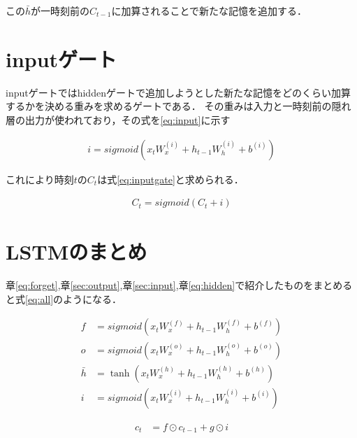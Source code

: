 \documentclass[a4j,11pt,report]{jsbook}
\begin{document}
この$\bar{h}$が一時刻前の$C_{t-1}$に加算されることで新たな記憶を追加する．


\section{inputゲート\label{sec:input}}

inputゲートではhiddenゲートで追加しようとした新たな記憶をどのくらい加算するかを決める重みを求めるゲートである．
その重みは入力と一時刻前の隠れ層の出力が使われており，その式を\ref{eq:input}に示す


\begin{equation}
  \label{eq:input}
  \begin{split}
    i = sigmoid(x_{t}W_{x}^{(i)} + h_{t-1}W_{h}^{(i)} + b^{(i)})
  \end{split}
\end{equation}

これにより時刻$t$の$C_{t}$は式\ref{eq:inputgate}と求められる．

\begin{equation}
  \label{eq:inputgate}
  \begin{split}
    C_{t} = sigmoid (C_{t} + i )
  \end{split}
\end{equation}

\section{LSTMのまとめ}
章\ref{eq:forget},章\ref{sec:output},章\ref{sec:input},章\ref{eq:hidden}で紹介したものをまとめると式\ref{eq:all}のようになる．


\begin{equation}
  \label{eq:all}
  \begin{split}
    f &= sigmoid(x_{t}W_{x}^{(f)} + h_{t-1}W_{h}^{(f)} + b^{(f)}) \\
    o &= sigmoid(x_{t}W_{x}^{(o)} + h_{t-1}W_{h}^{(o)} + b^{(o)}) \\
    \bar{h} &= \tanh(x_{t}W_{x}^{(h)} + h_{t-1}W_{h}^{(h)} + b^{(h)}) \\
    i &= sigmoid(x_{t}W_{x}^{(i)} + h_{t-1}W_{h}^{(i)} + b^{(i)})
  \end{split}
\end{equation}

\begin{equation}
  \label{eq:all2}
  \begin{split}
    c_{t} &= f \odot c_{t-1} + g \odot i
  \end{split}
\end{equation}
\end{document}
